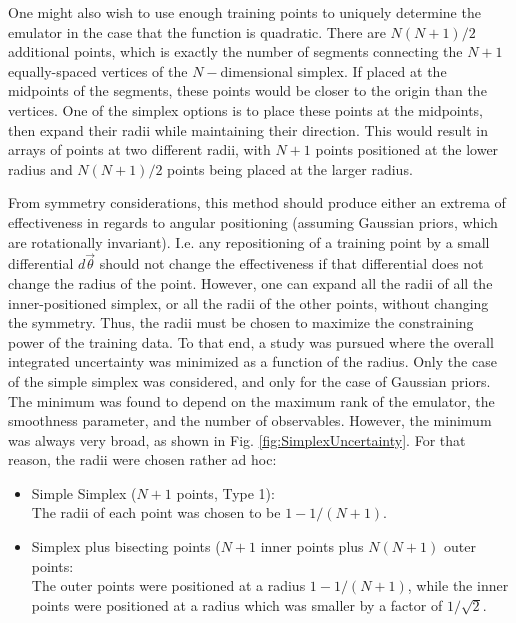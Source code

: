 \documentclass[UserManual.tex]{subfiles}
\begin{document}
One might also wish to use enough training points to uniquely determine the emulator in the case that the function is quadratic. There are $N(N+1)/2$ additional points, which is exactly the number of segments connecting the $N+1$ equally-spaced vertices of the  $N-$dimensional simplex. If placed at the midpoints of the segments, these points would be closer to the  origin than the vertices. One of the simplex options is to place these points at the midpoints, then expand their radii while maintaining their direction. This would result in arrays of points at two different radii, with $N+1$ points positioned at the lower radius and $N(N+1)/2$ points being placed at the larger radius.

From symmetry considerations, this method should produce either an extrema of effectiveness in regards to angular positioning (assuming Gaussian priors, which are rotationally invariant). I.e. any repositioning of a training point by a small differential $d\vec{\theta}$ should not change the effectiveness if that differential does not change the radius of the point. However, one can expand all the radii of all the inner-positioned simplex, or all the radii of the other points, without changing the symmetry. Thus, the radii must be chosen to maximize the constraining power of the training data. To that end, a study was pursued where the overall integrated uncertainty was minimized as a function of the radius. Only the case of the simple simplex was considered, and only for the case of Gaussian priors. The minimum was found to depend on the maximum rank of the emulator, the smoothness parameter, and the number of observables. However, the minimum was always very broad, as shown in Fig. \ref{fig:SimplexUncertainty}. For that reason, the radii were chosen rather ad hoc:
\begin{itemize}
\item Simple Simplex ($N+1$ points, Type 1):\\
The radii of each point was chosen to be $1-1/(N+1)$.
\item Simplex plus bisecting points ($N+1$ inner points plus $N(N+1)$ outer points:\\
The outer points were positioned at a radius $1-1/(N+1)$, while the inner points were positioned at a radius which was smaller by a factor of $1/\sqrt{2}$.
\end{itemize}
\end{document}
